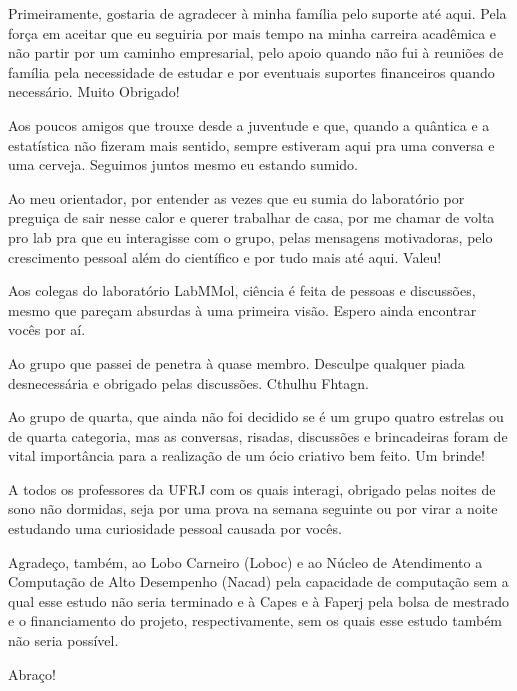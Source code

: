 \documentclass[
	12pt,				%
	openright,			%
	twoside,			%
	a4paper,			%
	english,			%
	french,				%
	spanish,			%
	brazil				%
	]{abntex2}
\begin{document}
\begin{agradecimentos}

Primeiramente, gostaria de agradecer à minha família pelo suporte até aqui. Pela força em aceitar que eu seguiria por mais tempo na minha carreira acadêmica e não partir por um caminho empresarial, pelo apoio quando não fui à reuniões de família pela necessidade de estudar e por eventuais suportes financeiros quando necessário. Muito Obrigado!

Aos poucos amigos que trouxe desde a juventude e que, quando a quântica e a estatística não fizeram mais sentido, sempre estiveram aqui pra uma conversa e uma cerveja. Seguimos juntos mesmo eu estando sumido.

Ao meu orientador, por entender as vezes que eu sumia do laboratório por preguiça de sair nesse calor e querer trabalhar de casa, por me chamar de volta pro lab pra que eu interagisse com o grupo, pelas mensagens motivadoras, pelo crescimento pessoal além do científico e por tudo mais até aqui. Valeu!

Aos colegas do laboratório LabMMol, ciência é feita de pessoas e discussões, mesmo que pareçam absurdas à uma primeira visão. Espero ainda encontrar vocês por aí.

Ao grupo que passei de penetra à quase membro. Desculpe qualquer piada desnecessária e obrigado pelas discussões. Cthulhu Fhtagn.

Ao grupo de quarta, que ainda não foi decidido se é um grupo quatro estrelas ou de quarta categoria, mas as conversas, risadas, discussões e brincadeiras foram de vital importância para a realização de um ócio criativo bem feito. Um brinde!

A todos os professores da UFRJ com os quais interagi, obrigado pelas noites de sono não dormidas, seja por uma prova na semana seguinte ou por virar a noite estudando uma curiosidade pessoal causada por vocês.

Agradeço, também, ao Lobo Carneiro (Loboc) e ao Núcleo de Atendimento a Computação de Alto Desempenho (Nacad) pela capacidade de computação sem a qual esse estudo não seria terminado e à Capes e à Faperj pela bolsa de mestrado e o financiamento do projeto, respectivamente, sem os quais esse estudo também não seria possível.

Abraço!


\end{agradecimentos}
\end{document}
